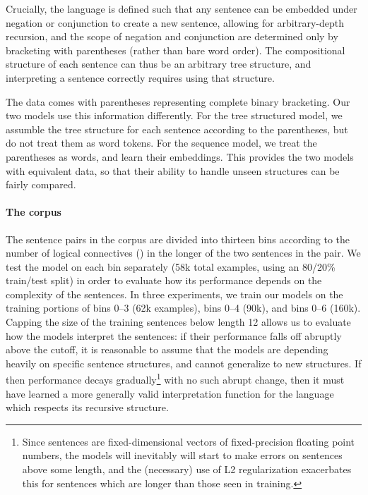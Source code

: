 Crucially, the language is defined such that any sentence can be embedded under negation or conjunction to create a new sentence, allowing for arbitrary-depth recursion, and the scope of negation and conjunction are determined only by bracketing with parentheses (rather than bare word order). The compositional structure of each sentence can thus be an arbitrary tree structure, and interpreting a sentence correctly requires using that structure.

The data comes with parentheses representing complete binary bracketing. Our two models use this information differently. For the tree structured model, we assumble the tree structure for each sentence according to the parentheses, but do not treat them as word tokens. For the sequence model, we treat the parentheses as words, and learn their embeddings. This provides the two models with equivalent data, so that their ability to handle unseen structures can be fairly compared.

\paragraph{The corpus}
The sentence pairs in the corpus are divided into thirteen bins according to the number of logical connectives () in the longer of the two sentences in the pair. We test the model on each bin separately (58k total examples, using an 80/20\% train/test split) in order to evaluate how its performance depends on the complexity of the sentences. In three experiments, we train our models on the training portions of bins 0--3 (62k examples), bins 0--4 (90k), and bins 0--6 (160k). Capping the size of the training sentences below length 12 allows us to evaluate how the models interpret the sentences: if their performance falls off abruptly above the cutoff, it is reasonable to assume that the models are depending heavily on specific sentence structures, and cannot generalize to new structures. If then performance decays gradually\footnote{Since sentences are fixed-dimensional vectors of fixed-precision floating point numbers, the models will inevitably will start to make errors on sentences above some length, and the (necessary) use of L2 regularization exacerbates this for sentences which are longer than those seen in training.} with no such abrupt change, then it must have learned a more generally valid interpretation function for the language which respects its recursive structure.



